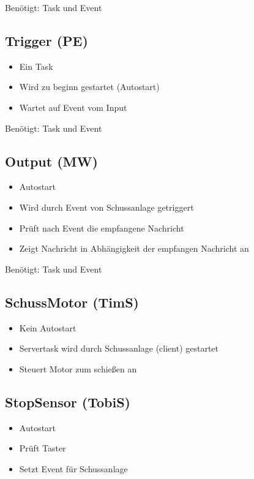 \documentclass[a4paper,11pt]{scrreprt}
\begin{document}
Benötigt: Task und Event

\subsection*{Trigger (PE)}

\begin{itemize}
 \item Ein Task
 \item Wird zu beginn gestartet (Autostart)
 \item Wartet auf Event vom Input
\end{itemize}

Benötigt: Task und Event

\subsection*{Output (MW)}

\begin{itemize}
 \item Autostart
 \item Wird durch Event von Schussanlage getriggert
 \item Prüft nach Event die empfangene Nachricht
 \item Zeigt Nachricht in Abhängigkeit der empfangen Nachricht an
\end{itemize}

Benötigt: Task und Event


\subsection*{SchussMotor (TimS)}

\begin{itemize}
 \item Kein Autostart
 \item Servertask wird durch Schussanlage (client) gestartet
 \item Steuert Motor zum schießen an
\end{itemize}


\subsection*{StopSensor (TobiS)}

\begin{itemize}
 \item Autostart
 \item Prüft Taster
 \item Setzt Event für Schussanlage
\end{itemize}
\end{document}
